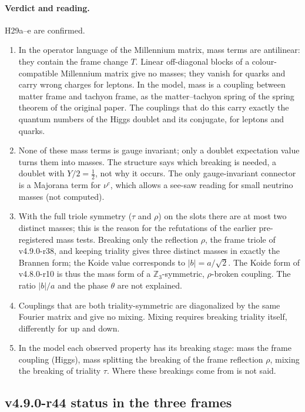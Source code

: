 \paragraph{Verdict and reading.}
H29a--e are confirmed.
\begin{enumerate}[leftmargin=2em]
\item In the operator language of the Millennium matrix, mass terms are antilinear: they contain the frame change \(T\).  Linear off-diagonal
blocks of a colour-compatible Millennium matrix give no masses; they vanish for quarks and carry wrong charges for leptons.  In the model,
mass is a coupling between matter frame and tachyon frame, as the matter--tachyon spring of the spring theorem of the original paper.  The
couplings that do this carry exactly the quantum numbers of the Higgs doublet and its conjugate, for leptons and quarks.
\item None of these mass terms is gauge invariant; only a doublet expectation value turns them into masses.  The structure says which
breaking is needed, a doublet with \(Y/2=\tfrac12\), not why it occurs.  The only gauge-invariant connector is a Majorana term for \(\nu^c\),
which allows a see-saw reading for small neutrino masses (not computed).
\item With the full triole symmetry (\(\tau\) and \(\rho\)) on the slots there are at most two distinct masses; this is the reason for the
refutations of the earlier pre-registered mass tests.  Breaking only the reflection \(\rho\), the frame triole of v4.9.0-r38, and keeping
triality gives three distinct masses in exactly the Brannen form; the Koide value corresponds to \(|b|=a/\sqrt2\).  The Koide form of
v4.8.0-r10 is thus the mass form of a \(\mathbb Z_3\)-symmetric, \(\rho\)-broken coupling.  The ratio \(|b|/a\) and the phase \(\theta\) are not
explained.
\item Couplings that are both triality-symmetric are diagonalized by the same Fourier matrix and give no mixing.  Mixing requires breaking
triality itself, differently for up and down.
\item In the model each observed property has its breaking stage: mass the frame coupling (Higgs), mass splitting the breaking of the frame
reflection \(\rho\), mixing the breaking of triality \(\tau\).  Where these breakings come from is not said.
\end{enumerate}

\subsection*{v4.9.0-r44 status in the three frames}
\label{subsec:v490-r44-frames}

